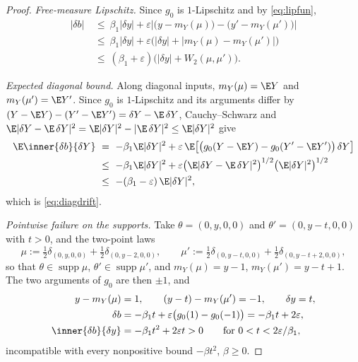 \begin{proof}
\emph{Free-measure Lipschitz.} Since $g_0$ is $1$-Lipschitz and by \eqref{eq:lipfun},
\[
\begin{aligned}
|\delta b|&\ \le\ \beta_1|\delta y|
+\varepsilon\bigl|\bigl(y-m_Y(\mu)\bigr)-\bigl(y'-m_Y(\mu')\bigr)\bigr|\\
&\ \le\ \beta_1|\delta y|+\varepsilon\bigl(|\delta y|+|m_Y(\mu)-m_Y(\mu')|\bigr)\\
&\ \le\ (\beta_1+\varepsilon)\bigl(|\delta y|+W_2(\mu,\mu')\bigr).
\end{aligned}
\]

\emph{Expected diagonal bound.} Along diagonal inputs, $m_Y(\mu)=\E Y$ and
$m_Y(\mu')=\E Y'$. Since $g_0$ is $1$-Lipschitz and its arguments differ by
$(Y-\E Y)-(Y'-\E Y')=\delta Y-\E\,\delta Y$, Cauchy--Schwarz and
$\E|\delta Y-\E\,\delta Y|^2=\E|\delta Y|^2-|\E\,\delta Y|^2\le\E|\delta Y|^2$ give
\[
\begin{aligned}
\E\inner{\delta b}{\delta Y}
&\ =\ -\beta_1\E|\delta Y|^2
+\varepsilon\,\E\bigl[\bigl(g_0(Y-\E Y)-g_0(Y'-\E Y')\bigr)\,\delta Y\bigr]\\
&\ \le\ -\beta_1\E|\delta Y|^2
+\varepsilon\bigl(\E|\delta Y-\E\,\delta Y|^2\bigr)^{1/2}\bigl(\E|\delta Y|^2\bigr)^{1/2}\\
&\ \le\ -(\beta_1-\varepsilon)\,\E|\delta Y|^2 ,
\end{aligned}
\]
which is \eqref{eq:diagdrift}.

\emph{Pointwise failure on the supports.} Take $\theta=(0,y,0,0)$ and
$\theta'=(0,y-t,0,0)$ with $t>0$, and the two-point laws
\[
\mu:=\tfrac12\delta_{(0,y,0,0)}+\tfrac12\delta_{(0,y-2,0,0)},\qquad
\mu':=\tfrac12\delta_{(0,y-t,0,0)}+\tfrac12\delta_{(0,y-t+2,0,0)},
\]
so that $\theta\in\operatorname{supp}\mu$, $\theta'\in\operatorname{supp}\mu'$, and
$m_Y(\mu)=y-1$, $m_Y(\mu')=y-t+1$. The two arguments of $g_0$ are then $\pm1$, and
\[
\begin{aligned}
y-m_Y(\mu)&=1, \qquad (y-t)-m_Y(\mu')=-1, \qquad \delta y=t,\\
\delta b&=-\beta_1t+\varepsilon\bigl(g_0(1)-g_0(-1)\bigr)=-\beta_1t+2\varepsilon,\\
\inner{\delta b}{\delta y}&=-\beta_1t^2+2\varepsilon t>0
\qquad\text{for }0<t<2\varepsilon/\beta_1,
\end{aligned}
\]
incompatible with every nonpositive bound $-\beta t^2$, $\beta\ge0$.
\end{proof}

